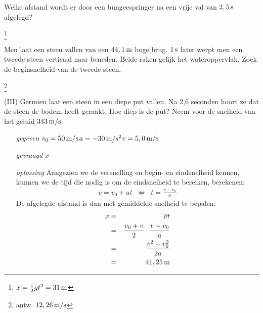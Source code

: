 \begin{exercise} Welke afstand wordt er door een bungeespringer na een vrije val van $2,5\rm\,s$ afgelegd?
\begin{oplossing}
\footnote{$x=\frac{1}{2}gt^2=31\rm\,m$}
\end{oplossing}







\end{exercise}

\begin{exercise} Men laat een steen vallen van een $44,1\rm\,m$ hoge brug. $1\rm\,s$ later werpt men een tweede steen verticaal naar beneden. Beide raken gelijk het wateroppervlak. Zoek de beginsnelheid van de tweede steen.
\begin{oplossing}
\footnote{antw. $12,26\rm\,m/s$}
\end{oplossing}












\end{exercise}

\begin{exercise} (III) Germien laat een steen in een diepe put vallen. Na 2,6 seconden hoort ze dat de steen de bodem heeft geraakt. Hoe diep is de put? Neem voor de snelheid van het geluid $343\rm\,m/s$.




\begin{oplossing}
\begin{enumerate}
\item[\textit{gegeven}]$v_0=50\rm\,m/s$\newline$a=-30\rm\,m/s^2$\newline$v=5,0\rm\,m/s$
\item[\textit{gevraagd}]$x$
\item[\textit{oplossing}]Aangezien we de versnelling en begin- en eindsnelheid kennen, kunnen we de tijd die nodig is om de eindsnelheid te bereiken, berekenen:
\begin{eqnarray*}
v=v_0+at&\Leftrightarrow&t=\frac{v-v_0}{a}
\end{eqnarray*}
De afgelegde afstand is dan met gemiddelde snelheid te bepalen:
\begin{eqnarray*}
x&=&\overline{v}t\\
&=&\frac{v_0+v}{2}\cdot\frac{v-v_0}{a}\\
&=&\frac{v^2-v_0^2}{2a}\\
&=&41,25\rm\,m
\end{eqnarray*}
\end{enumerate}
\end{oplossing}
	



\end{exercise}


